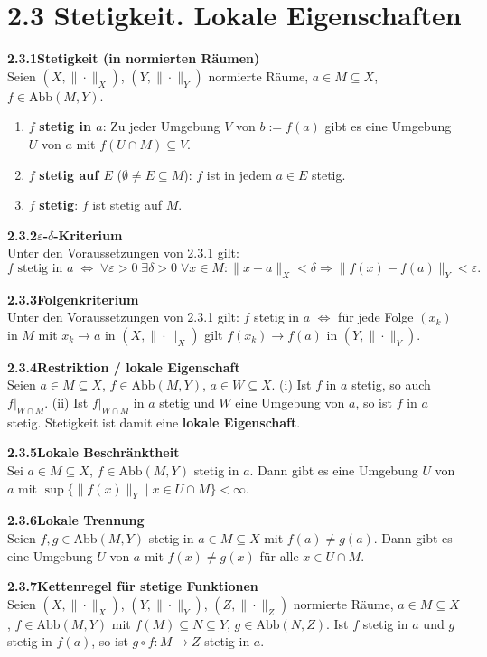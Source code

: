 \documentclass[a4paper,12pt]{article}
\newcommand{\gentry}[3]{%
  \noindent\textbf{#1\quad #2}\nopagebreak\\[0.2em]
  #3\par\smallskip
}
\begin{document}
\section*{2.3 \quad Stetigkeit. Lokale Eigenschaften}

\gentry{2.3.1}{Stetigkeit (in normierten Räumen)}{%
  Seien $(X, \|\cdot\|_X)$, $(Y, \|\cdot\|_Y)$ normierte Räume, $a \in M \subseteq X$,
  $f \in \mathrm{Abb}(M, Y)$.
  \begin{enumerate}[label=(\roman*),topsep=2pt,itemsep=1pt]
    \item $f$ \textbf{stetig in $a$}: Zu jeder Umgebung $V$ von $b := f(a)$ gibt
          es eine Umgebung $U$ von $a$ mit $f(U \cap M) \subseteq V$.
    \item $f$ \textbf{stetig auf $E$} ($\emptyset \neq E \subseteq M$):
          $f$ ist in jedem $a \in E$ stetig.
    \item $f$ \textbf{stetig}: $f$ ist stetig auf $M$.
  \end{enumerate}
}

\gentry{2.3.2}{$\varepsilon$-$\delta$-Kriterium}{%
  Unter den Voraussetzungen von 2.3.1 gilt:
  \[
    f \text{ stetig in } a \;\Longleftrightarrow\;
    \forall \varepsilon > 0\;\exists \delta > 0\;\forall x \in M:
    \|x - a\|_X < \delta \Rightarrow \|f(x) - f(a)\|_Y < \varepsilon.
  \]
}

\gentry{2.3.3}{Folgenkriterium}{%
  Unter den Voraussetzungen von 2.3.1 gilt:
  $f$ stetig in $a$ $\Longleftrightarrow$ für jede Folge $(x_k)$ in $M$ mit
  $x_k \to a$ in $(X, \|\cdot\|_X)$ gilt $f(x_k) \to f(a)$ in $(Y, \|\cdot\|_Y)$.
}

\gentry{2.3.4}{Restriktion / lokale Eigenschaft}{%
  Seien $a \in M \subseteq X$, $f \in \mathrm{Abb}(M, Y)$, $a \in W \subseteq X$.
  (i) Ist $f$ in $a$ stetig, so auch $f|_{W \cap M}$.
  (ii) Ist $f|_{W \cap M}$ in $a$ stetig und $W$ eine Umgebung von $a$, so ist
  $f$ in $a$ stetig. Stetigkeit ist damit eine \textbf{lokale Eigenschaft}.
}

\gentry{2.3.5}{Lokale Beschränktheit}{%
  Sei $a \in M \subseteq X$, $f \in \mathrm{Abb}(M, Y)$ stetig in $a$. Dann gibt
  es eine Umgebung $U$ von $a$ mit $\sup\{\|f(x)\|_Y \mid x \in U \cap M\} < \infty$.
}

\gentry{2.3.6}{Lokale Trennung}{%
  Seien $f, g \in \mathrm{Abb}(M, Y)$ stetig in $a \in M \subseteq X$ mit
  $f(a) \neq g(a)$. Dann gibt es eine Umgebung $U$ von $a$ mit
  $f(x) \neq g(x)$ für alle $x \in U \cap M$.
}

\gentry{2.3.7}{Kettenregel für stetige Funktionen}{%
  Seien $(X, \|\cdot\|_X)$, $(Y, \|\cdot\|_Y)$, $(Z, \|\cdot\|_Z)$ normierte Räume,
  $a \in M \subseteq X$, $f \in \mathrm{Abb}(M, Y)$ mit $f(M) \subseteq N \subseteq Y$,
  $g \in \mathrm{Abb}(N, Z)$. Ist $f$ stetig in $a$ und $g$ stetig in $f(a)$, so
  ist $g \circ f: M \to Z$ stetig in $a$.
}
\end{document}
